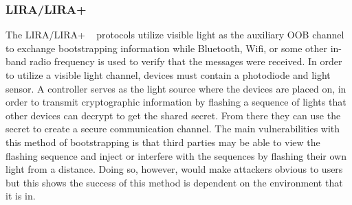 \subsubsection{LIRA/LIRA+}
The LIRA/LIRA+ ~\cite{kovavcevic2016flashing} protocols utilize visible light as the auxiliary OOB channel to exchange bootstrapping information while Bluetooth, Wifi, or some other in-band radio frequency is used to verify that the messages were received. In order to utilize a visible light channel, devices must contain a photodiode and light sensor. A controller serves as the light source where the devices are placed on, in order to transmit cryptographic information by flashing a sequence of lights that other devices can decrypt to get the shared secret. From there they can use the secret to create a secure communication channel. The main vulnerabilities with this method of bootstrapping is that third parties may be able to view the flashing sequence and inject or interfere with the sequences by flashing their own light from a distance. Doing so, however, would make attackers obvious to users but this shows the success of this method is dependent on the environment that it is in.
